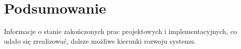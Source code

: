 \chapter{Podsumowanie}
\thispagestyle{chapterBeginStyle}

Informacje o stanie zakończonych prac projektowych i implementacyjnych, co udało się zrealizować, dalsze możliwe kierunki rozwoju systemu.






